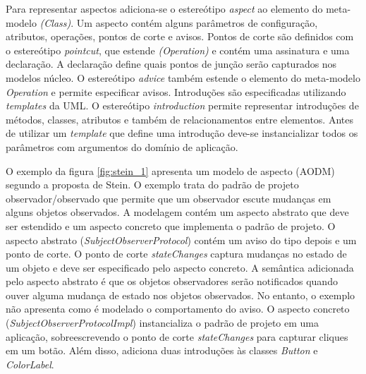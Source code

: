 Para representar aspectos adiciona-se o estereótipo \textit{aspect} ao elemento do meta-modelo \textit{(Class)}. Um aspecto contém alguns parâmetros
de configuração, atributos, operações, pontos de corte e avisos. Pontos de corte são definidos com o estereótipo \textit{pointcut}, que 
estende \textit{(Operation)} e contém uma assinatura e uma declaração. A declaração define quais pontos de junção serão capturados nos modelos
núcleo. O estereótipo \textit{advice} também estende o elemento do meta-modelo \textit{Operation} e permite especificar avisos. 
Introduções são especificadas utilizando \textit{templates} da UML.  O estereótipo \textit{introduction} permite representar introduções de métodos,
classes, atributos e também de relacionamentos entre elementos. Antes de utilizar um \textit{template} que define uma introdução deve-se instancializar 
todos os parâmetros com argumentos do domínio de aplicação. 

O exemplo da figura \ref{fig:stein_1} apresenta um modelo de aspecto (AODM) segundo a proposta de Stein. O exemplo trata do padrão de projeto
observador/observado que permite que um observador escute mudanças em alguns objetos observados. A modelagem contém um aspecto abstrato que deve ser
estendido e um aspecto concreto que implementa o padrão de projeto. O aspecto abstrato (\textit{SubjectObserverProtocol}) contém um aviso do tipo
depois e um ponto de corte. O ponto de corte \textit{stateChanges} captura mudanças no estado de um objeto e deve ser especificado pelo aspecto
concreto. A semântica adicionada pelo aspecto abstrato é que os objetos observadores serão notificados quando ouver alguma mudança de estado nos
objetos observados. No entanto, o exemplo não apresenta como é modelado o comportamento do aviso. O aspecto concreto
(\textit{SubjectObserverProtocolImpl}) instancializa o padrão de projeto em uma aplicação, sobreescrevendo o ponto de corte \textit{stateChanges} para 
capturar cliques em um botão. Além disso, adiciona duas introduções às classes \textit{Button} e \textit{ColorLabel}. 

